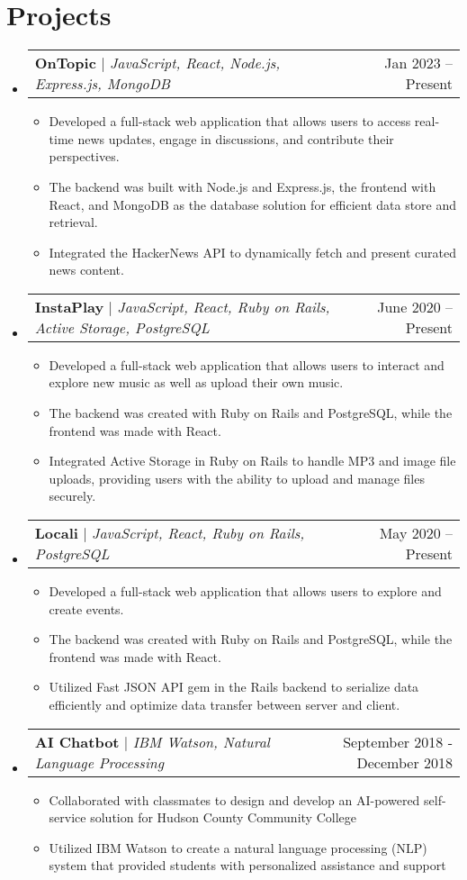 \documentclass[letterpaper,11pt]{article}
\makeatletter
\newcommand{\resumeItem}[1]{
  \item\small{
    {#1 \vspace{-2pt}}
  }
}
\newcommand{\resumeProjectHeading}[2]{
    \item
    \begin{tabular*}{0.97\textwidth}{l@{\extracolsep{\fill}}r}
      \small#1 & #2 \\
    \end{tabular*}\vspace{-7pt}
}
\newcommand{\resumeSubHeadingListStart}{\begin{itemize}[leftmargin=0.15in, label={}]}
\newcommand{\resumeSubHeadingListEnd}{\end{itemize}}
\newcommand{\resumeItemListStart}{\begin{itemize}}
\newcommand{\resumeItemListEnd}{\end{itemize}\vspace{-5pt}}
\makeatother
\begin{document}
\section{Projects}
    \resumeSubHeadingListStart
      \resumeProjectHeading
          {\textbf{OnTopic} $|$ \emph{JavaScript, React, Node.js, Express.js, MongoDB}}{Jan 2023 -- Present}
          \resumeItemListStart
            \resumeItem{Developed a full-stack web application that allows users to access real-time news updates, engage in discussions, and contribute their perspectives.}
            \resumeItem{The backend was built with Node.js and Express.js, the frontend with React, and MongoDB as the database solution for efficient data store and retrieval.}
            \resumeItem{Integrated the HackerNews API to dynamically fetch and present curated news content.}
          \resumeItemListEnd
      \resumeProjectHeading
          {\textbf{InstaPlay} $|$ \emph{JavaScript, React, Ruby on Rails, Active Storage, PostgreSQL}}{June 2020 -- Present}
          \resumeItemListStart
            \resumeItem{Developed a full-stack web application that allows users to interact and explore new music as well as upload their own music.}
            \resumeItem{The backend was created with Ruby on Rails and PostgreSQL, while the frontend was made with React.}
            \resumeItem{Integrated Active Storage in Ruby on Rails to handle MP3 and image file uploads, providing users with the ability to upload and manage files securely.}
          \resumeItemListEnd
      \resumeProjectHeading
          {\textbf{Locali} $|$ \emph{JavaScript, React, Ruby on Rails, PostgreSQL}}{May 2020 -- Present}
          \resumeItemListStart
            \resumeItem{Developed a full-stack web application that allows users to explore and create events.}
            \resumeItem{The backend was created with Ruby on Rails and PostgreSQL, while the frontend was made with React.}
            \resumeItem{Utilized Fast JSON API gem in the Rails backend to serialize data efficiently and optimize data transfer between server and client.}
          \resumeItemListEnd
      \resumeProjectHeading
          {\textbf{AI Chatbot} $|$ \emph{IBM Watson, Natural Language Processing}}{September 2018 - December 2018}
          \resumeItemListStart
            \resumeItem{Collaborated with classmates to design and develop an AI-powered self-service solution for Hudson County Community College}
            \resumeItem{Utilized IBM Watson to create a natural language processing (NLP) system that provided students with personalized assistance and support}
          \resumeItemListEnd
    \resumeSubHeadingListEnd
\end{document}

